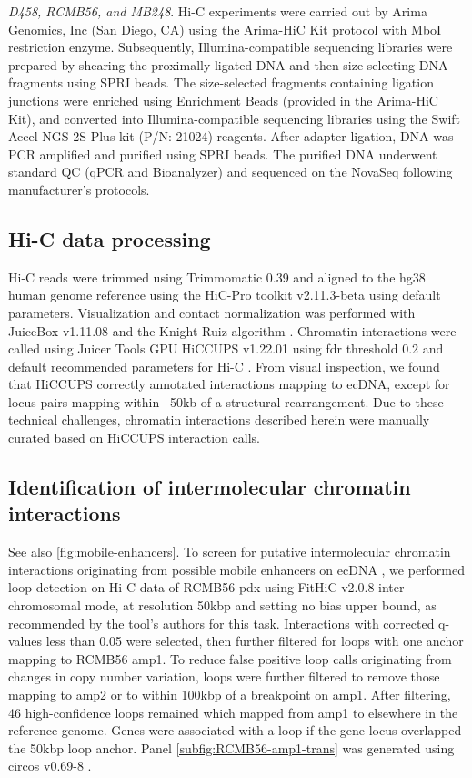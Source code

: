 \textit{D458, RCMB56, and MB248}. Hi-C experiments were carried out by Arima Genomics, Inc (San Diego, CA) using the Arima-HiC Kit protocol with MboI restriction enzyme. Subsequently, Illumina-compatible sequencing libraries were prepared by shearing the proximally ligated DNA and then size-selecting DNA fragments using SPRI beads. The size-selected fragments containing ligation junctions were enriched using Enrichment Beads (provided in the Arima-HiC Kit), and converted into Illumina-compatible sequencing libraries using the Swift Accel-NGS 2S Plus kit (P/N: 21024) reagents. After adapter ligation, DNA was PCR amplified and purified using SPRI beads. The purified DNA underwent standard QC (qPCR and Bioanalyzer) and sequenced on the NovaSeq following manufacturer's protocols.

\subsection{Hi-C data processing}
Hi-C reads were trimmed using Trimmomatic 0.39 \cite{trimmomatic} and aligned to the hg38 human genome reference using the HiC-Pro toolkit v2.11.3-beta using default parameters\cite{hic-pro}. Visualization and contact normalization was performed with JuiceBox v1.11.08 \cite{juicebox} and the Knight-Ruiz algorithm \cite{kr}. Chromatin interactions were called using Juicer Tools GPU HiCCUPS v1.22.01 \cite{juicer} using fdr threshold 0.2 and default recommended parameters for Hi-C \cite{rao_2014}. From visual inspection, we found that HiCCUPS correctly annotated interactions mapping to ecDNA, except for locus pairs mapping within ~50kb of a structural rearrangement. Due to these technical challenges, chromatin interactions described herein were manually curated based on HiCCUPS interaction calls. 

\subsection{Identification of intermolecular chromatin interactions} 
See also \ref{fig:mobile-enhancers}. To screen for putative intermolecular chromatin interactions originating from possible mobile enhancers on ecDNA \cite{Zhu_2021}, we performed loop detection on Hi-C data of RCMB56-pdx using FitHiC v2.0.8 \cite{fithic2} inter-chromosomal mode, at resolution 50kbp and setting no bias upper bound, as recommended by the tool's authors for this task. Interactions with corrected q-values less than 0.05 were selected, then further filtered for loops with one anchor mapping to RCMB56 amp1. To reduce false positive loop calls originating from changes in copy number variation, loops were further filtered to remove those mapping to amp2 or to within 100kbp of a breakpoint on amp1. After filtering, 46 high-confidence loops remained which mapped from amp1 to elsewhere in the reference genome. Genes were associated with a loop if the gene locus overlapped the 50kbp loop anchor. Panel \ref{subfig:RCMB56-amp1-trans} was generated using circos v0.69-8 \cite{circos}.

